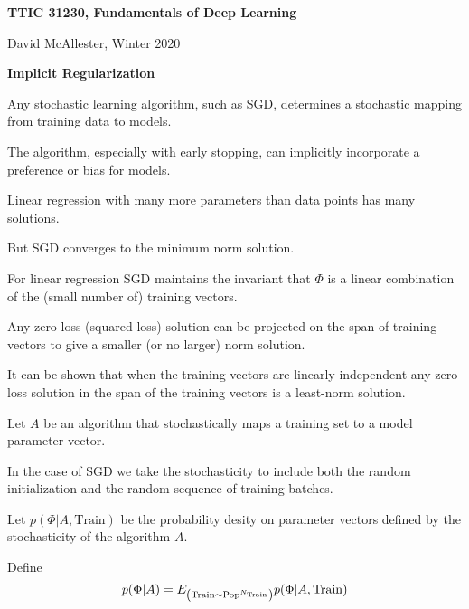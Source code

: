 





{\Huge


\centerline{\bf TTIC 31230, Fundamentals of Deep Learning}
\bigskip
\centerline{David McAllester, Winter 2020}

\vfill
\centerline{\bf Implicit Regularization}
\vfill
\vfill


Any stochastic learning algorithm, such as SGD, determines a stochastic mapping from training data to models.

\vfill
The algorithm, especially with early stopping, can implicitly incorporate a preference or bias for models.


Linear regression with many more parameters than data points
has many solutions.

\vfill
But SGD converges to the minimum norm solution.


For linear regression SGD maintains the invariant that $\Phi$ is a linear combination of the (small number of) training vectors.

\vfill
Any zero-loss (squared loss) solution can be projected on the span of training vectors to give a smaller (or no larger) norm solution.

\vfill
It can be shown that when the training vectors are linearly independent any zero loss solution in the span of the training vectors is a least-norm solution.


Let $A$ be an algorithm that stochastically maps a training set to a model parameter vector.

\vfill
In the case of SGD we take the stochasticity to include both the random initialization and the random sequence of training batches.


\vfill
Let $p(\Phi|A,\mathrm{Train})$ be the probability desity on parameter vectors defined by the stochasticity of the algorithm $A$.

\vfill
Define
$$p(\Phi|A) = E_{\left(\mathrm{Train} \sim \mathrm{Pop}^{N_\mathrm{Train}}\right)} p(\Phi|A,\mathrm{Train})$$

}
